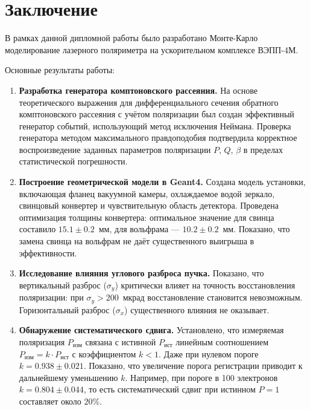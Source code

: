 \documentclass[14pt, a4paper]{extreport}
\begin{document}
\chapter*{ Заключение}
В рамках данной дипломной работы было разработано Монте-Карло моделирование лазерного поляриметра на ускорительном комплексе ВЭПП-4М.

Основные результаты работы:

\begin{enumerate}
    \item \textbf{Разработка генератора комптоновского рассеяния.} На основе теоретического выражения для дифференциального сечения обратного комптоновского рассеяния с учётом поляризации был создан эффективный генератор событий, использующий метод исключения Неймана. Проверка генератора методом максимального правдоподобия подтвердила корректное воспроизведение заданных параметров поляризации $P$, $Q$, $\beta$ в пределах статистической погрешности.

    \item \textbf{Построение геометрической модели в Geant4.} Создана модель установки, включающая фланец вакуумной камеры, охлаждаемое водой зеркало, свинцовый конвертер и чувствительную область детектора. Проведена оптимизация толщины конвертера: оптимальное значение для свинца составило $15.1 \pm 0.2$~мм, для вольфрама — $10.2 \pm 0.2$~мм. Показано, что замена свинца на вольфрам не даёт существенного выигрыша в эффективности.

    \item \textbf{Исследование влияния углового разброса пучка.} Показано, что вертикальный разброс ($\sigma_y$) критически влияет на точность восстановления поляризации: при $\sigma_y > 200$~мкрад восстановление становится невозможным. Горизонтальный разброс ($\sigma_x$) существенного влияния не оказывает. 

    \item \textbf{Обнаружение систематического сдвига.} Установлено, что измеряемая поляризация $P_{\text{изм}}$ связана с истинной $P_{\text{ист}}$ линейным соотношением $P_{\text{изм}} = k \cdot P_{\text{ист}}$ с коэффициентом $k < 1$. Даже при нулевом пороге $k = 0.938 \pm 0.021$. Показано, что увеличение порога регистрации приводит к дальнейшему уменьшению $k$. Например, при пороге в 100 электронов $k=0.804 \pm 0.044$, то есть систематический сдвиг при истинном $P=1$ составляет около $20\%$.
\end{enumerate}
\end{document}
